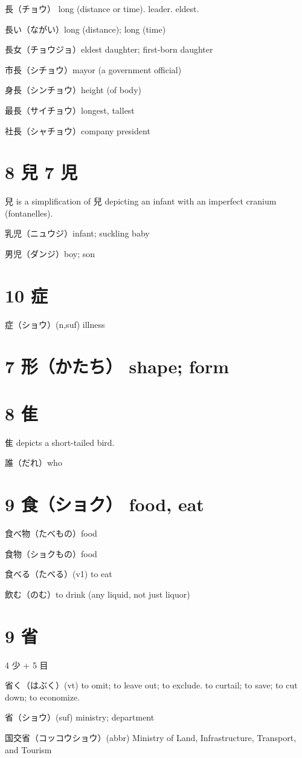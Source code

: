 長（チョウ）
long (distance or time).
leader.
eldest.

長い（ながい）long (distance); long (time)

長女（チョウジョ）eldest daughter; first-born daughter

市長（シチョウ）mayor (a government official)

身長（シンチョウ）height (of body)

最長（サイチョウ）longest, tallest

社長（シャチョウ）company president

\section{8 兒 7 児}

兒 is a simplification of 兒 depicting an infant
with an imperfect cranium (fontanelles).

乳児（ニュウジ）infant; suckling baby

男児（ダンジ）boy; son

\section{10 症}

症（ショウ）(n,suf) illness

\section{7 形（かたち） shape; form}

\section{8 隹}

隹 depicts a short-tailed bird.

誰（だれ）who

\section{9 食（ショク） food, eat}

食べ物（たべもの）food

食物（ショクもの）food

食べる（たべる）(v1) to eat

飲む（のむ）to drink (any liquid, not just liquor)

\section{9 省}

4 少 + 5 目

省く（はぶく）(vt)
to omit; to leave out; to exclude.
to curtail; to save; to cut down; to economize.

省（ショウ）(suf) ministry; department

国交省（コッコウショウ）(abbr)
Ministry of Land, Infrastructure, Transport, and Tourism
